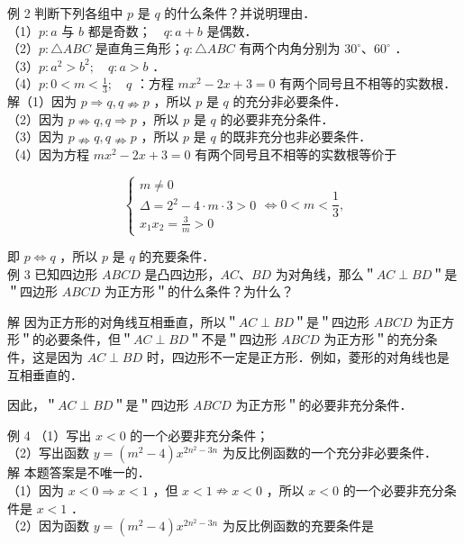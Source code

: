 \documentclass[10pt]{article}
\begin{document}
例 2 判断下列各组中 \(p\) 是 \(q\) 的什么条件？并说明理由．\\
（1）\(p: a\) 与 \(b\) 都是奇数；\(\quad q: a+b\) 是偶数．\\
（2）\(p: \triangle A B C\) 是直角三角形；\(q: \triangle A B C\) 有两个内角分别为 \(30^{\circ} 、 60^{\circ}\) ．\\
（3）\(p: a^{2}>b^{2} ; \quad q: a>b\) ．\\
（4）\(p: 0<m<\frac{1}{3} ; \quad q\) ：方程 \(m x^{2}-2 x+3=0\) 有两个同号且不相等的实数根．\\
解（1）因为 \(p \Rightarrow q, q \nRightarrow p\) ，所以 \(p\) 是 \(q\) 的充分非必要条件．\\
（2）因为 \(p \nRightarrow q, q \Rightarrow p\) ，所以 \(p\) 是 \(q\) 的必要非充分条件．\\
（3）因为 \(p \nRightarrow q, q \nRightarrow p\) ，所以 \(p\) 是 \(q\) 的既非充分也非必要条件．\\
（4）因为方程 \(m x^{2}-2 x+3=0\) 有两个同号且不相等的实数根等价于

\[
\left\{\begin{array}{l}
m \neq 0 \\
\Delta=2^{2}-4 \cdot m \cdot 3>0 \\
x_{1} x_{2}=\frac{3}{m}>0
\end{array} \Leftrightarrow 0<m<\frac{1}{3},\right.
\]

即 \(p \Leftrightarrow q\) ，所以 \(p\) 是 \(q\) 的充要条件．\\
例 3 已知四边形 \(A B C D\) 是凸四边形，\(A C 、 B D\) 为对角线，那么＂\(A C \perp B D\)＂是＂四边形 \(A B C D\) 为正方形＂的什么条件？为什么？

解 因为正方形的对角线互相垂直，所以＂\(A C \perp B D\)＂是＂四边形 \(A B C D\) 为正方形＂的必要条件，但＂\(A C \perp B D\)＂不是＂四边形 \(A B C D\) 为正方形＂的充分条件，这是因为 \(A C \perp B D\) 时，四边形不一定是正方形．例如，菱形的对角线也是互相垂直的．

因此，＂\(A C \perp B D\)＂是＂四边形 \(A B C D\) 为正方形＂的必要非充分条件．

例 4 （1）写出 \(x<0\) 的一个必要非充分条件；\\
（2）写出函数 \(y=\left(m^{2}-4\right) x^{2 n^{2}-3 n}\) 为反比例函数的一个充分非必要条件．\\
解 本题答案是不唯一的．\\
（1）因为 \(x<0 \Rightarrow x<1\) ，但 \(x<1 \nRightarrow x<0\) ，所以 \(x<0\) 的一个必要非充分条件是 \(x<1\) ．\\
（2）因为函数 \(y=\left(m^{2}-4\right) x^{2 n^{2}-3 n}\) 为反比例函数的充要条件是
\end{document}
